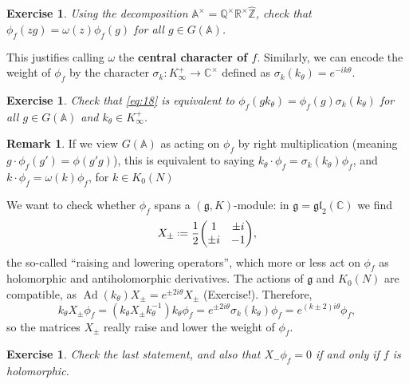 \documentclass[11pt]{report}
\let\mbb\mathbb
\let\mf\mathfrak
\newcommand{\1}{\mathbbm 1}
\newcommand{\Z}{\mathbb{Z}}
\newcommand{\Q}{\mathbb{Q}}
\newcommand{\R}{\mathbb{R}}
\newcommand{\C}{\mathbb{C}}
\newcommand{\A}{\mbb A}
\newcommand*{\defeq}{\mathrel{\vcenter{\baselineskip0.5ex \lineskiplimit0pt
      \hbox{\scriptsize.}\hbox{\scriptsize.}}}%
  =}
\DeclareMathOperator{\Ad}{Ad}
\theoremstyle{plain}
\newcounter{ex}
\newtheorem{exercise}[ex]{Exercise}
\theoremstyle{definition}
\newtheorem{remark}[thm]{Remark}
\theoremstyle{remark}
\numberwithin{equation}{section}
\begin{document}
\begin{exercise}\label{ex:centre}
  Using the decomposition $\A^{\times} = \Q^{\times}\R^{\times}\hat{\Z}$, check that 
  $\phi_{f}(zg) = \omega(z)\phi_{f}(g)$ for all $g \in G(\A)$.
\end{exercise}
This justifies calling $\omega$ the \textbf{central character of $f$}.
Similarly, we can encode the weight of $\phi_{f}$ by the character
$\sigma_{k}\colon K_{\infty}^{+} \to \C^{\times}$ defined as $\sigma_{k}(k_{\theta}) = e^{-ik\theta}$.

\begin{exercise}
Check that \cref{eq:18} is equivalent to $\phi_{f}(gk_{\theta}) =
\phi_{f}(g)\sigma_{k}(k_{\theta})$ for all $g \in G(\A)$ and $k_{\theta} \in K_{\infty}^{+}$. 
\end{exercise}

\begin{remark}
  If we view $G(\A)$ as acting on $\phi_{f}$ by right multiplication
  (meaning $g \cdot \phi_{f}(g') = \phi(g'g)$), this is equivalent to saying
  $k_{\theta} \cdot \phi_{f} = \sigma_{k}(k_{\theta}) \phi_{f}$, and
  $k\cdot \phi_{f} = \omega(k)\phi_{f}$, for $k \in K_{0}(N)$
\end{remark}

We want to check whether $\phi_{f}$ spans a $(\mf g,K)$-module:
in $\mf g = \mf{gl}_{2}(\C) $ we find
\begin{equation}
  \label{eq:27}
X_{\pm} \defeq \frac{1}{2}\mqty(1 & \pm i \\ \pm i & -1),
\end{equation}
the so-called ``raising and lowering operators'', which more or less
act on $\phi_{f}$ as holomorphic and antiholomorphic derivatives.  The
actions of $\mf g$ and $K_{0}(N)$ are compatible, as
$\Ad(k_{\theta})X_{\pm} = e^{\pm 2i\theta}X_{\pm}$ (Exercise!). Therefore,
\begin{equation}
  \label{eq:34}
 k_{\theta}X_{\pm}\phi_{f} = (k_{\theta}X_{\pm}k_{\theta}^{-1})k_{\theta}\phi_{f} =
 e^{\pm2i\theta}\sigma_{k}(k_{\theta}) \phi_{f} = e^{(k\pm2)i\theta}\phi_{f},
\end{equation}
so the matrices $X_{\pm}$ really raise and lower the weight of
$\phi_{f}$.

\begin{exercise}
  Check the last statement, and also that $X_{-}\phi_{f} = 0$ if and only
  if $f$ is holomorphic.
\end{exercise}
\end{document}
